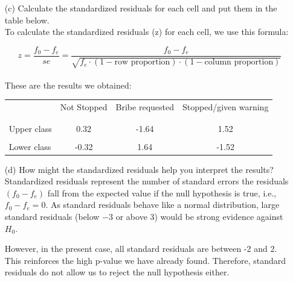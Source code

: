\documentclass[12pt,letterpaper]{article}
\begin{document}
\begin{enumerate}
		\newpage
	
		\item [(c)] Calculate the standardized residuals for each cell and put them in the table below.\\
		
		To calculate the standardized residuals (z) for each cell, we use this formula:
		
		$$z = \frac{f_0 - f_e}{se} = \frac{f_0 - f_e}{\sqrt{f_e \cdot (1-\text{row proportion}) \cdot (1-\text{column proportion})}}$$\\
		
			
		
		These are the results we obtained:
		
		\begin{table}[h]
		\centering
			\begin{tabular}{l | c c c }
				& Not Stopped & Bribe requested & Stopped/given warning \\
				\\[-1.8ex] 
				\hline \\[-1.8ex]
				Upper class  & 0.32 & -1.64 & 1.52 \\
				\\[-1.8ex]
				Lower class & -0.32 & 1.64 & -1.52 \\
			\end{tabular}
		\end{table}
		
		\vspace{.5cm}
	
		\item [(d)] How might the standardized residuals help you interpret the results?\\
		
		Standardized residuals represent the number of standard errors the residuals $(f_0 - f_e)$ fall from the expected value if the null hypothesis is true, i.e., $f_0-f_e=0$. As standard residuals behave like a normal distribution, large standard residuals (below $-3$ or above $3$) would be strong evidence against $H_0$.
		
		However, in the present case, all standard residuals are between -2 and 2. This reinforces the high p-value we have already found. Therefore, standard residuals do not allow us to reject the null hypothesis either.
	
	
	\end{enumerate}

\newpage
\end{document}
